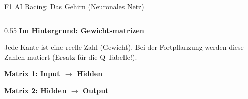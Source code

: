 \documentclass[aspectratio=169]{beamer}
\begin{document}
\begin{frame}{F1 AI Racing: Das Gehirn (Neuronales Netz)}
\begin{columns}[T]
\begin{column}{0.55\textwidth}
\textbf{Im Hintergrund: Gewichtsmatrizen}
\tiny

Jede Kante ist eine reelle Zahl (Gewicht). Bei der Fortpflanzung werden diese Zahlen mutiert (Ersatz für die Q-Tabelle!).

\vspace{-0.2cm}
\begin{center}
\renewcommand{\arraystretch}{1.0}
\textbf{Matrix 1: Input $\rightarrow$ Hidden}\\

\vspace{0.1cm}
\textbf{Matrix 2: Hidden $\rightarrow$ Output}\\
\end{center}
\end{column}
\end{columns}
\end{frame}
\end{document}
